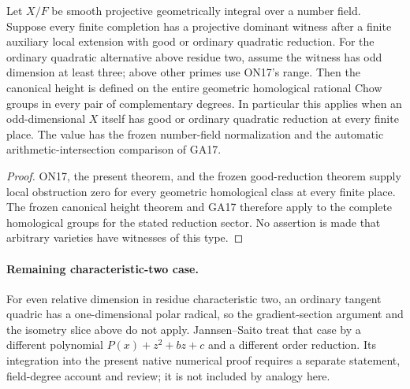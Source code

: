 \begin{corollary}
\label{r17c2:height}
Let $X/F$ be smooth projective geometrically integral over
a number field. Suppose every finite completion has a
projective dominant witness after a finite auxiliary local
extension with good or ordinary quadratic reduction. For
the ordinary quadratic alternative above residue two,
assume the witness has odd dimension at least three;
above other primes use ON17's range.
Then the canonical height is defined on the entire
geometric homological rational Chow groups in every pair
of complementary degrees. In particular this applies
when an odd-dimensional $X$ itself has good or ordinary
quadratic reduction at every finite place.
The value has the frozen number-field normalization and
the automatic arithmetic-intersection comparison of GA17.
\end{corollary}

\begin{proof}
ON17, the present theorem, and the frozen good-reduction
theorem supply local obstruction zero for every geometric
homological class at every finite place. The frozen
canonical height theorem and GA17 therefore apply to the
complete homological groups for the stated reduction
sector. No assertion is made that arbitrary varieties
have witnesses of this type.
\end{proof}

\paragraph{Remaining characteristic-two case.}
For even relative dimension in residue characteristic two,
an ordinary tangent quadric has a one-dimensional polar
radical, so the gradient-section argument and the isometry
slice above do not apply. Jannsen--Saito treat that case
by a different polynomial $P(x)+z^2+bz+c$ and a different
order reduction. Its integration into the present native
numerical proof requires a separate statement, field-degree
account and review; it is not included by analogy here.
